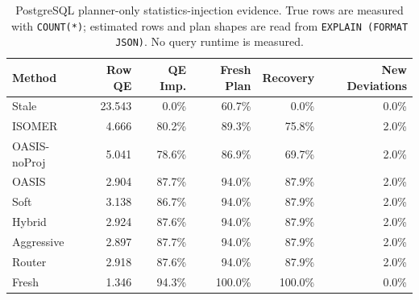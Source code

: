 \begin{table}[t]
  \centering
  \small
  \caption{PostgreSQL planner-only statistics-injection evidence. True rows are measured with \texttt{COUNT(*)}; estimated rows and plan shapes are read from \texttt{EXPLAIN (FORMAT JSON)}. No query runtime is measured.}
  \label{tab:postgres_planner_stats_injection}
  \setlength{\tabcolsep}{4pt}
  \begin{tabular}{lrrrrr}
    \toprule
    Method & Row QE & QE Imp. & Fresh Plan & Recovery & New Deviations \\
    \midrule
    Stale & 23.543 & 0.0\% & 60.7\% & 0.0\% & 0.0\% \\
    ISOMER & 4.666 & 80.2\% & 89.3\% & 75.8\% & 2.0\% \\
    OASIS-noProj & 5.041 & 78.6\% & 86.9\% & 69.7\% & 2.0\% \\
    OASIS & 2.904 & 87.7\% & 94.0\% & 87.9\% & 2.0\% \\
    Soft & 3.138 & 86.7\% & 94.0\% & 87.9\% & 2.0\% \\
    Hybrid & 2.924 & 87.6\% & 94.0\% & 87.9\% & 2.0\% \\
    Aggressive & 2.897 & 87.7\% & 94.0\% & 87.9\% & 2.0\% \\
    Router & 2.918 & 87.6\% & 94.0\% & 87.9\% & 2.0\% \\
    Fresh & 1.346 & 94.3\% & 100.0\% & 100.0\% & 0.0\% \\
    \bottomrule
  \end{tabular}
\end{table}
